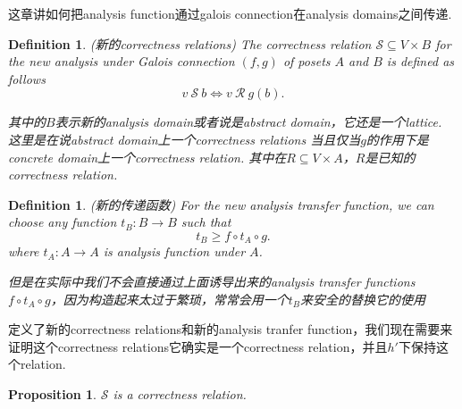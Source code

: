 \documentclass{article}
\newtheorem{proposition}[theorem]{Proposition}
\newtheorem{definition}[theorem]{Definition}
\newcommand*{\xfunc}[4]{{#2}\colon{#3}{#1}{#4}}
\newcommand*{\func}[3]{\xfunc{\to}{#1}{#2}{#3}}
\begin{document}
{\color{red} 这章讲如何把analysis function通过galois connection在analysis domains之间传递}.

\begin{definition}
\rm {\color{red}(新的correctness relations)} The correctness relation $\mathcal{S} \subseteq V \times B$ for the new analysis under Galois connection $(f,g)$ of posets $A$ and $B$ is defined as follows
$$
v~\mathcal{S}~b \iff v~\mathcal{R}~g(b).
$$

{\color{red} 其中的$B$表示新的analysis domain或者说是abstract domain，它还是一个lattice}. {\color{blue} 这里是在说abstract domain上一个correctness relations 当且仅当$g$的作用下是concrete domain上一个correctness relation}. 其中在$R \subseteq V \times A$，$R$是已知的correctness relation. 
\end{definition}


\begin{definition}
\rm {\color{red} (新的传递函数)} For the new analysis transfer function, we can choose any function $\func{t_B}{B}{B}$ such that
$$
t_B \geq f \circ t_A \circ g.
$$
where $\func{t_A}{A}{A}$ is analysis function under $A$.
\begin{center}
\end{center}
{\color{blue} 但是在实际中我们不会直接通过上面诱导出来的analysis transfer functions $f \circ t_A \circ g$，因为构造起来太过于繁琐，常常会用一个$t_B$来安全的替换它的使用}
\end{definition}



{\color{red} 定义了新的correctness relations和新的analysis tranfer function，我们现在需要来证明这个correctness relations它确实是一个correctness relation，并且$h'$下保持这个relation}.

\begin{proposition}
\rm $\mathcal{S}$ is a correctness relation.
\end{proposition}
\end{document}

